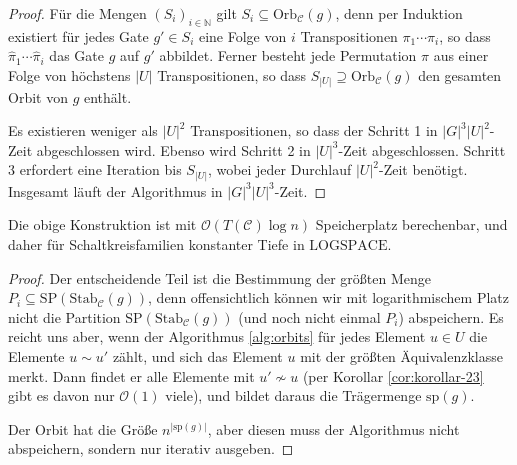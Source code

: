 \begin{proof}
Für die Mengen $\left(S_{i}\right)_{i\in\mathbb{N}}$ gilt $S_{i}\subseteq\mathrm{Orb}_{\mathcal{C}}\left(g\right)$,
denn per Induktion existiert für jedes Gate $g'\in S_{i}$ eine Folge
von $i$ Transpositionen $\pi_{1}\cdots\pi_{i}$, so dass $\hat{\pi}_{1}\cdots\hat{\pi}_{i}$
das Gate $g$ auf $g'$ abbildet. Ferner besteht jede Permutation
$\pi$ aus einer Folge von höchstens $\left|U\right|$ Transpositionen,
so dass $S_{\left|U\right|}\supseteq\mathrm{Orb}_{\mathcal{C}}\left(g\right)$
den gesamten Orbit von $g$ enthält.

Es existieren weniger als $\left|U\right|^{2}$ Transpositionen, so
dass der Schritt 1 in $\left|G\right|^{3}\left|U\right|^{2}$-Zeit
abgeschlossen wird. Ebenso wird Schritt 2 in $\left|U\right|^{3}$-Zeit
abgeschlossen. Schritt 3 erfordert eine Iteration bis $S_{\left|U\right|}$,
wobei jeder Durchlauf $\left|U\right|^{2}$-Zeit benötigt. Insgesamt
läuft der Algorithmus in $\left|G\right|^{3}\left|U\right|^{3}$-Zeit.
\end{proof}
\begin{prop}
Die obige Konstruktion ist mit $\mathcal{O}\left(T\left(\mathcal{C}\right)\log n\right)$
Speicherplatz berechenbar, und daher für Schaltkreisfamilien konstanter
Tiefe in $\mathrm{LOGSPACE}$.
\end{prop}
\begin{proof}
Der entscheidende Teil ist die Bestimmung der größten Menge $P_{i}\subseteq\mathrm{SP}\left(\mathrm{Stab}_{\mathcal{C}}\left(g\right)\right)$,
denn offensichtlich können wir mit logarithmischem Platz nicht die
Partition $\mathrm{SP}\left(\mathrm{Stab}_{\mathcal{C}}\left(g\right)\right)$
(und noch nicht einmal $P_{i}$) abspeichern. Es reicht uns aber,
wenn der Algorithmus \ref{alg:orbits} für jedes Element $u\in U$
die Elemente $u\sim u'$ zählt, und sich das Element $u$ mit der
größten Äquivalenzklasse merkt. Dann findet er alle Elemente mit $u'\not\sim u$
(per Korollar \ref{cor:korollar-23} gibt es davon nur $\mathcal{O}\left(1\right)$
viele), und bildet daraus die Trägermenge $\mathrm{sp}\left(g\right)$.

Der Orbit hat die Größe $n^{\left|\mathrm{sp}\left(g\right)\right|}$,
aber diesen muss der Algorithmus nicht abspeichern, sondern nur iterativ
ausgeben.
\end{proof}

